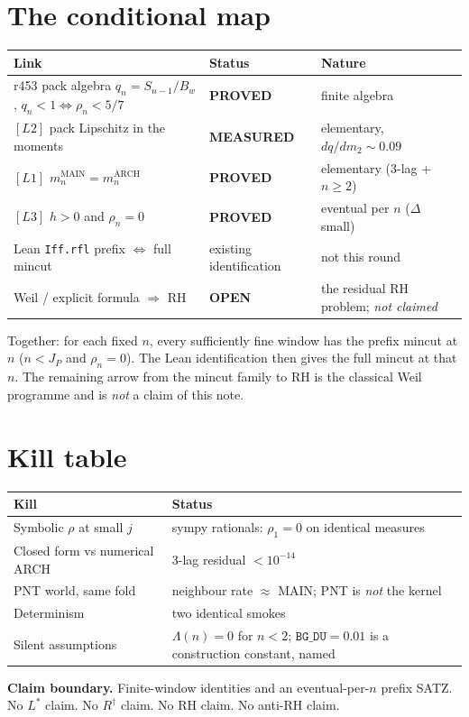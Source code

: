 \documentclass[11pt]{article}
\begin{document}
\section{The conditional map}\label{sec:map}

\begin{center}
\begin{tabular}{@{}lll@{}}
\toprule
Link & Status & Nature \\
\midrule
r453 pack algebra
  $q_n=S_{n-1}/B_w$,
  $q_n<1\Leftrightarrow\rho_n<5/7$
  & \textbf{PROVED}
  & finite algebra \\
$[L2]$ pack Lipschitz in the moments
  & \textbf{MEASURED}
  & elementary, $dq/dm_2\sim 0.09$ \\
$[L1]$ $m_n^{\mathrm{MAIN}}=m_n^{\mathrm{ARCH}}$
  & \textbf{PROVED}
  & elementary (3-lag + $n\ge 2$) \\
$[L3]$ $h>0$ and $\rho_n=0$
  & \textbf{PROVED}
  & eventual per $n$
    ($\Delta$ small) \\
Lean \texttt{Iff.rfl}
  prefix $\Leftrightarrow$ full mincut
  & existing identification
  & not this round \\
Weil / explicit formula $\Rightarrow$ RH
  & \textbf{OPEN}
  & the residual RH problem;
    \emph{not claimed} \\
\bottomrule
\end{tabular}
\end{center}

Together: for each fixed $n$, every
sufficiently fine window has the prefix
mincut at $n$
($n<J_P$ and $\rho_n=0$).
The Lean identification then gives the
full mincut at that $n$.
The remaining arrow from the mincut
family to RH is the classical Weil
programme and is \emph{not} a claim of
this note.

\section{Kill table}\label{sec:kills}

\begin{center}
\begin{tabular}{@{}lp{8.2cm}@{}}
\toprule
Kill & Status \\
\midrule
Symbolic $\rho$ at small $j$
  & sympy rationals: $\rho_1=0$
    on identical measures \\
Closed form vs numerical ARCH
  & 3-lag residual $<10^{-14}$ \\
PNT world, same fold
  & neighbour rate $\approx$ MAIN;
    PNT is \emph{not} the kernel \\
Determinism
  & two identical smokes \\
Silent assumptions
  & $\Lambda(n)=0$ for $n<2$;
    $\mathtt{BG\_DU}=0.01$ is a
    construction constant, named \\
\bottomrule
\end{tabular}
\end{center}

\medskip\noindent
\textbf{Claim boundary.}\enspace
Finite-window identities and an
eventual-per-$n$ prefix SATZ.
No $L^{*}$ claim.
No $R^{\dagger}$ claim.
No RH claim.
No anti-RH claim.
\end{document}
